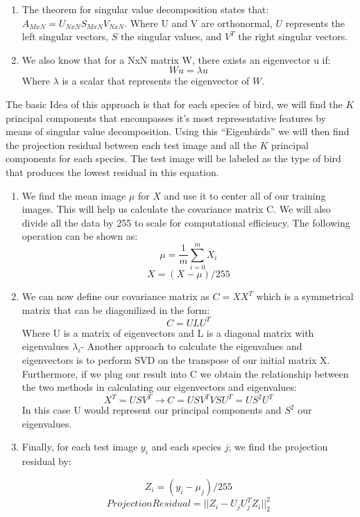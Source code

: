 \documentclass[11pt]{article}
\begin{document}
\begin{singlespace}
\begin{enumerate}
\item The theorem for singular value decomposition states that: $ A_{MxN} = U_{NxN}S_{MxN}V_{NxN}$. Where U and V are orthonormal, $U$ represents the left singular vectors, $S$ the singular values, and $V^T$ the right singular vectors.
\item We also know that for a NxN matrix W, there exists an eigenvector u if:
$$ Wu = \lambda u $$ 
Where $\lambda$ is a scalar that represents the eigenvector of $W$. 
\end{enumerate}

The basic Idea of this approach is that for each species of bird, we will find the $K$ principal components that encompasses it's most representative features by means of singular value decomposition. Using this ``Eigenbirds'' we will then find the projection residual between each test image and all the $K$ principal components for each species. The test image will be labeled as the type of bird that produces the lowest residual in this equation. 

\begin{enumerate}
\item We find the mean image $\mu$ for $X$ and use it to center all of our training images. This will help us calculate the covariance matrix C. We will also divide all the data by 255 to scale for computational efficiency. The following operation can be shown as:
$$ \mu = \frac{1}{m}\sum_{i=0}^{m}X_i $$
$$ X = (X-\mu)/255 $$

\item We can now define our covariance matrix as $ C = XX^T $ which is a symmetrical matrix that can be diagonilized in the form: 
$$ C = ULU^T$$ 
Where U is a matrix of eigenvectors and L is a diagonal matrix with eigenvalues $\lambda_i$- Another approach to calculate the eigenvalues and eigenvectors is to perform SVD on the transpose of our initial matrix X. Furthermore, if we plug our result into C we obtain the relationship between the two methods in calculating our eigenvectors and eigenvalues:
$$ X^T = USV^T  \rightarrow C = USV^TVSU^T = US^2U^T$$
In this case U would represent our principal components and $S^2$ our eigenvalues. 

\item Finally, for each test image $y_i$ and each species $j$; we find the projection residual by:

$$ Z_i = (y_i - \mu_j )/255$$
$$ Projection Residual = || Z_i - U_jU_j^TZ_i ||^2_2 $$


\end{enumerate}
\end{singlespace}
\end{document}
